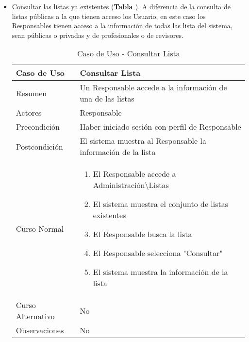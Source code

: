 \begin{itemize}
	\item \addtocounter{tabla}{1} Consultar las listas ya existentes (\textbf{\hyperref[tab:curConsultarLista]{Tabla }}). A diferencia de la consulta de listas públicas a la que tienen acceso los Usuario, en este caso los Responsables tienen acceso a la información de todas las lista del sistema, sean públicas o privadas y de profesionales o de revisores.
		\begin{table}[!htbp]
		  \centering  \addtocounter{casouso}{1}
		  \begin{tabular}{|l | p{100mm}|}
		    \textbf{Caso de Uso}  & \textbf{Consultar Lista} \\ \hline
		    Resumen 		 & Un Responsable accede a la información de una de las listas \\ \hline
		    Actores  		 & Responsable \\ \hline
		    Precondición  	 & Haber iniciado sesión con perfil de Responsable \\ \hline
		    Postcondición  	 & El sistema muestra al Responsable la información de la lista \\ \hline
		    Curso Normal   	 & \begin{enumerate}
			  \item El Responsable accede a Administración\textbackslash Listas
			  \item El sistema muestra el conjunto de listas existentes
			  \item El Responsable busca la lista
			  \item El Responsable selecciona "Consultar"
			  \item El sistema muestra la información de la lista
		    \end{enumerate}  \\ \hline
		    Curso Alternativo  & No  \\ \hline
		    Observaciones 	 & No \\ \hline
		  \end{tabular}
		  \caption{Caso de Uso  - Consultar Lista}
		  \label{tab:curConsultarLista}
		\end{table}
		\FloatBarrier \pagebreak


\end{itemize}
